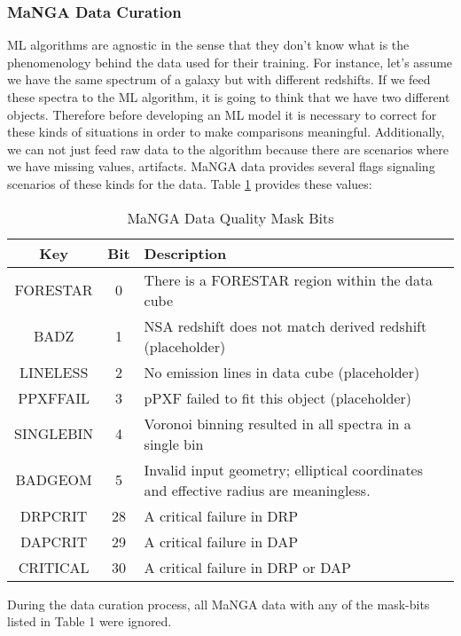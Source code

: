 \subsubsection{MaNGA Data Curation}

ML algorithms are agnostic in the sense that they don't know what is the phenomenology behind the data used for their training. For instance, let's assume we have the same spectrum of a galaxy but with different redshifts. If we feed these spectra to the ML algorithm, it is going to think that we have two different objects. Therefore before developing an ML model it is necessary to correct for these kinds of situations in order to make comparisons meaningful. Additionally, we can not just feed raw data to the algorithm because there are scenarios where we have missing values, artifacts. MaNGA data provides several flags signaling scenarios of these kinds for the data. Table \ref{table:MaNGA Data Quality Mask Bits} provides these values:

\begin{table}[h!]
\centering
\begin{tabular}{|c|c|l|} 
 \hline
 Key & Bit & Description \\ [0.5ex] 
 \hline
 FORESTAR & 0 & There is a FORESTAR region within the data cube \\ 
 \hline
 BADZ & 1 & NSA redshift does not match derived redshift (placeholder) \\
 \hline
 LINELESS & 2 & No emission lines in data cube (placeholder) \\
 \hline
 PPXFFAIL & 3 & pPXF failed to fit this object (placeholder) \\
 \hline
 SINGLEBIN & 4 & Voronoi binning resulted in all spectra in a single bin \\
 \hline
 BADGEOM & 5 & Invalid input geometry; elliptical coordinates and effective radius are meaningless. \\
 \hline
 DRPCRIT & 28 & A critical failure in DRP \\
 \hline
 DAPCRIT & 29 & A critical failure in DAP \\ 
 \hline
 CRITICAL & 30 & A critical failure in DRP or DAP \\ [1ex] 
 \hline
\end{tabular}
\caption{MaNGA Data Quality Mask Bits}
\label{table:MaNGA Data Quality Mask Bits}
\end{table}

During the data curation process, all MaNGA data with any of the mask-bits listed in Table 1 were ignored.
